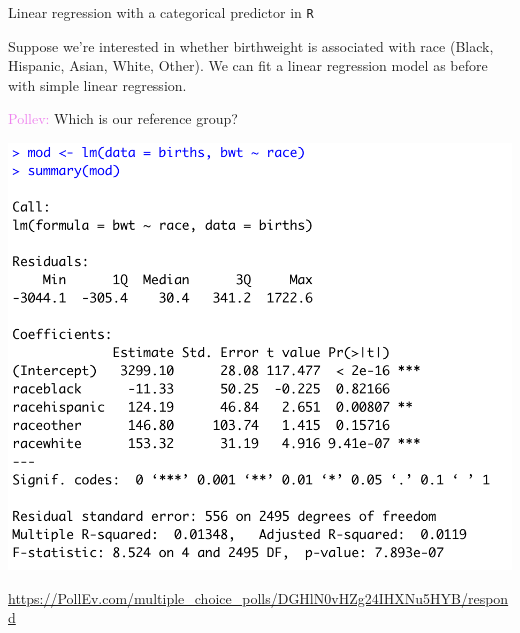 \documentclass[10pt,t]{beamer}
\begin{document}
\begin{frame}{Linear regression with a categorical predictor in \texttt{R}}
	\vspace{-7 mm}
	
Suppose we're interested in whether birthweight is associated with race (Black, Hispanic, Asian, White, Other). We can fit a linear regression model as before with simple linear regression.
\medskip

\textcolor{violet}{Pollev:} Which is our reference group?

\vspace{0.3cm}

\centering

\includegraphics[scale=0.4]{figures/multilevel_cat_lm.png}


\smallskip
\raggedright
\scriptsize{\url{https://PollEv.com/multiple_choice_polls/DGHlN0vHZg24IHXNu5HYB/respond}}

\end{frame}
\end{document}
